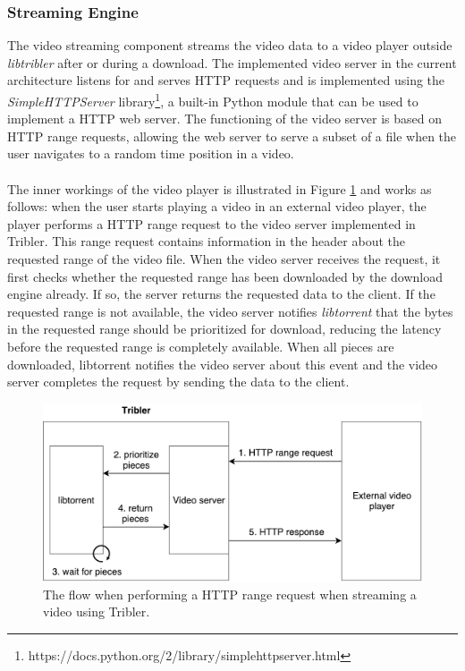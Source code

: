 \subsubsection{\textbf{Streaming Engine}}
\label{subsubsec:video-server}
The video streaming component streams the video data to a video player outside \emph{libtribler} after or during a download. The implemented video server in the current architecture listens for and serves HTTP requests and is implemented using the \emph{SimpleHTTPServer} library\footnote{https://docs.python.org/2/library/simplehttpserver.html}, a built-in Python module that can be used to implement a HTTP web server. The functioning of the video server is based on HTTP range requests, allowing the web server to serve a subset of a file when the user navigates to a random time position in a video.\\\\
The inner workings of the video player is illustrated in Figure \ref{fig:video-server} and works as follows: when the user starts playing a video in an external video player, the player performs a HTTP range request to the video server implemented in Tribler. This range request contains information in the header about the requested range of the video file. When the video server receives the request, it first checks whether the requested range has been downloaded by the download engine already. If so, the server returns the requested data to the client. If the requested range is not available, the video server notifies \emph{libtorrent} that the bytes in the requested range should be prioritized for download, reducing the latency before the requested range is completely available. When all pieces are downloaded, libtorrent notifies the video server about this event and the video server completes the request by sending the data to the client.\\

\begin{figure}[h!]
	\centering
	\includegraphics[width=0.7\columnwidth]{images/architecture/video_server}
	\caption{The flow when performing a HTTP range request when streaming a video using Tribler.}
	\label{fig:video-server}
\end{figure}

